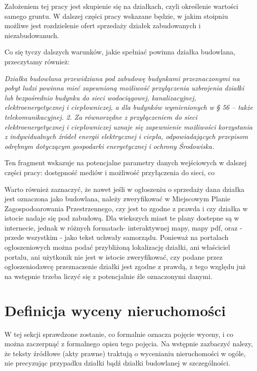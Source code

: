 \documentclass[a4paper,12pt,twoside,openany]{report}
\begin{document}
Założeniem tej pracy jest skupienie się na działkach, czyli określenie wartości samego gruntu. W dalszej części pracy wskazane będzie, w jakim stoipniu możliwe jest rozdzielenie ofert sprzedaży działek zabudowanych i niezabudowanuch.


Co się tyczy dalszych warunków, jakie spełniać powinna działka budowlana, przeczytamy również: 


 \textit {Działka budowlana przewidziana pod zabudowę budynkami przeznaczonymi na pobyt ludzi powinna mieć zapewnioną możliwość przyłączenia uzbrojenia działki lub bezpośrednio budynku do sieci wodociągowej, kanalizacyjnej, elektroenergetycznej i ciepłowniczej, a dla budynków wymienionych w § 56 – także telekomunikacyjnej. 2. Za równorzędne z przyłączeniem do sieci elektroenergetycznej i ciepłowniczej uznaje się zapewnienie możliwości korzystania  z indywidualnych  źródeł  energii  elektrycznej  i ciepła,  odpowiadających  przepisom  odrębnym dotyczącym gospodarki energetycznej i ochrony Środowiska.}\cite{RMI}

Ten fragment wskazuje na potencjalne parametry danych wejściowych w dalszej części pracy: dostępność mediów i możliwość przyłączenia do sieci, co 


Warto również zaznaczyć, że nawet jeśli w ogłoszeniu o sprzedaży dana działka jest oznaczona jako budowlana, należy zweryfikować w  Miejscowym Planie Zagospodoarowania Przestrzennego, czy jest to zgodne z prawda i czy działka w istocie nadaje się pod zabudową. Dla wiekszych miast te plany dostepne są w internecie, jednak w różnych formatach- interaktywnej mapy, mapy pdf, oraz - przede wszystkim - jako tekst uchwały samorządu. 
Ponieważ na portalach ogłoszeniowych można podać przybliżoną lokalizację działki, ani właściciel portalu, ani użytkonik nie jest w istocie zweryfikować, czy podane przez ogłoszeniodawcę przeznaczenie działki jest zgodne z prawdą, z tego względu już na wstępnie trzeba liczyć się z potencjalnie źle oznaczonymi danymi.



\section{Definicja wyceny nieruchomości}
W tej sekcji sprawdzone zostanie, co formalnie oznacza pojęcie wyceny, i co można zaczerpnąć z formalnego opisu tego pojęcia. Na wstępnie zazbaczyć nalezy, że teksty źródłowe (akty prawne) traktują  o wycenianiu nieruchomości w ogóle, nie precyzując przypadku działki bądź działki budowlanej w szczególności.
\end{document}

